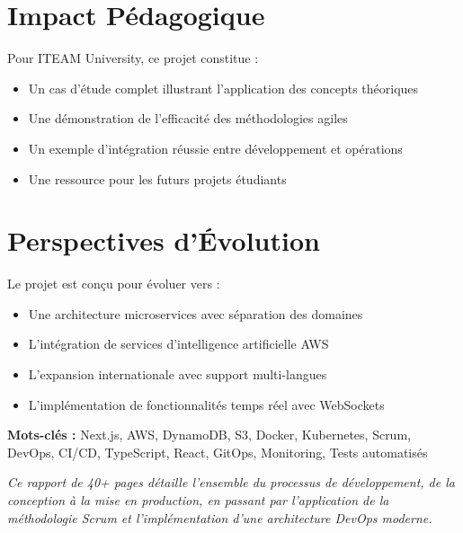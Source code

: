 \documentclass[12pt,a4paper]{report}
\begin{document}
\section*{Impact Pédagogique}
Pour ITEAM University, ce projet constitue :
\begin{itemize}
    \item Un cas d'étude complet illustrant l'application des concepts théoriques
    \item Une démonstration de l'efficacité des méthodologies agiles
    \item Un exemple d'intégration réussie entre développement et opérations
    \item Une ressource pour les futurs projets étudiants
\end{itemize}

\section*{Perspectives d'Évolution}
Le projet est conçu pour évoluer vers :
\begin{itemize}
    \item Une architecture microservices avec séparation des domaines
    \item L'intégration de services d'intelligence artificielle AWS
    \item L'expansion internationale avec support multi-langues
    \item L'implémentation de fonctionnalités temps réel avec WebSockets
\end{itemize}

\vspace{1cm}

\textbf{Mots-clés :} Next.js, AWS, DynamoDB, S3, Docker, Kubernetes, Scrum, DevOps, CI/CD, TypeScript, React, GitOps, Monitoring, Tests automatisés

\vspace{1cm}

\noindent\textit{Ce rapport de 40+ pages détaille l'ensemble du processus de développement, de la conception à la mise en production, en passant par l'application de la méthodologie Scrum et l'implémentation d'une architecture DevOps moderne.}
\end{document}
